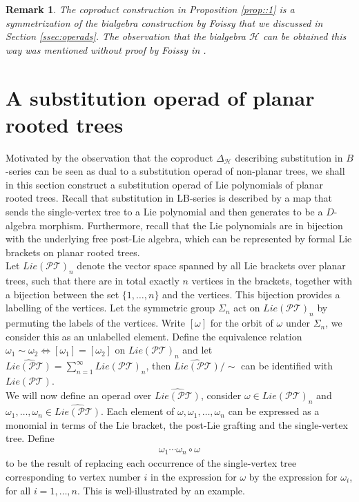 \documentclass[10pt,a4paper]{article}
\newtheorem{remark}{Remark}
\begin{document}
\begin{remark}
The coproduct construction in Proposition \ref{prop::1} is a symmetrization of the bialgebra construction by Foissy that we discussed in Section \ref{ssec:operads}. The observation that the bialgebra $\mathcal{H}$ can be obtained this way was mentioned without proof by Foissy in \cite{Foissy2017}.
\end{remark}


\section{A substitution operad of planar rooted trees}
\label{sec:planarSubsOperad}

Motivated by the observation that the coproduct $\Delta_{\mathcal{H}}$ describing substitution in $B$-series can be seen as dual to a substitution operad of non-planar trees, we shall in this section construct a substitution operad of Lie polynomials of planar rooted trees. Recall that substitution in LB-series is described by a map that sends the single-vertex tree to a Lie polynomial and then generates to be a $D$-algebra morphism. Furthermore, recall that the Lie polynomials are in bijection with the underlying free post-Lie algebra, which can be represented by formal Lie brackets on planar rooted trees. \\

Let $Lie(\mathcal{PT})_n$ denote the vector space spanned by all Lie brackets over planar trees, such that there are in total exactly $n$ vertices in the brackets, together with a bijection between the set $\{1,\ldots,n \}$ and the vertices. This bijection provides a labelling of the vertices. Let the symmetric group $\Sigma_n$ act on $Lie(\mathcal{PT})_n$ by permuting the labels of the vertices. Write $[\omega]$ for the orbit of $\omega$ under $\Sigma_n$, we consider this as an unlabelled element. Define the equivalence relation $\omega_1 \sim \omega_2 \iff [\omega_1]=[\omega_2]$ on $Lie(\mathcal{PT})_n$ and let $\widehat{Lie(\mathcal{PT})}=\sum_{n=1}^{\infty}Lie(\mathcal{PT})_n$, then $\widehat{Lie(\mathcal{PT})}/\sim$ can be identified with $Lie(\mathcal{PT})$. \\

We will now define an operad over $\widehat{Lie(\mathcal{PT})}$, consider $\omega \in Lie(\mathcal{PT})_n$ and $\omega_1,\ldots,\omega_n \in \widehat{Lie(\mathcal{PT})}$. Each element of $\omega,\omega_1,\ldots,\omega_n$ can be expressed as a monomial in terms of the Lie bracket, the post-Lie grafting and the single-vertex tree. Define
\begin{align*}
\omega_1 \cdots \omega_n \circ \omega
\end{align*}
to be the result of replacing each occurrence of the single-vertex tree corresponding to vertex number $i$ in the expression for $\omega$ by the expression for $\omega_i$, for all $i=1,\ldots,n$. This is well-illustrated by an example.
\end{document}
